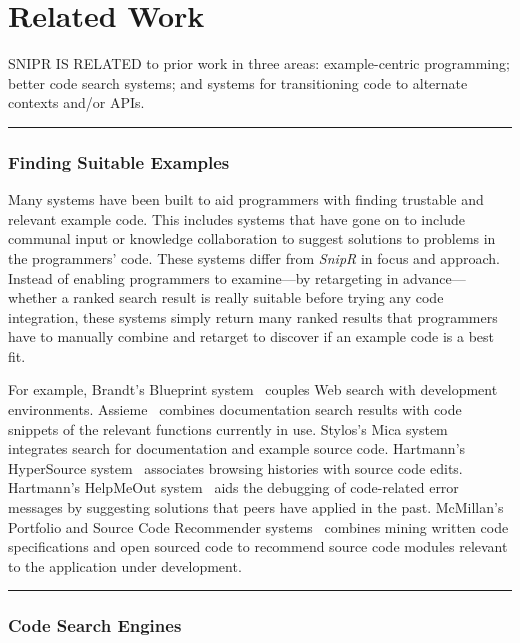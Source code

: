 \chapter{Related Work}{}
\label{sec:related}

\lettrine[lraise=0.1, nindent=0em, slope=-.5em]{S} {NIPR IS RELATED} to prior work in three areas: example-centric programming; better code search systems; and systems for transitioning code to alternate contexts and/or APIs.

\fancybreak{\pfbreakdisplay}

\subsection{Finding Suitable Examples}
\label{sec:codesearch}

Many systems have been built to aid programmers with finding trustable and relevant example code. This includes systems that have gone on to include communal input or knowledge collaboration to suggest solutions to problems in the programmers' code. These systems differ from \emph{SnipR} in focus and approach. Instead of enabling programmers to examine---by retargeting in advance---whether a ranked search result is really suitable before trying any code integration, these systems simply return many ranked results that programmers have to manually combine and retarget to discover if an example code is a best fit. 

For example, Brandt’s Blueprint system~\cite{Brandt:2010tp} couples Web search with development environments. Assieme~\cite{Hoffmann:2007wo} combines documentation search results with code snippets of the relevant functions currently in use. Stylos's Mica system~\cite{Stylos:2006gu} integrates search for documentation and example source code. Hartmann's HyperSource system~\cite{Hartmann:2011ii} associates browsing histories with source code edits. Hartmann's HelpMeOut system~\cite{Hartmann:2010hx} aids the debugging of code-related error messages by suggesting solutions that peers have applied in the past. McMillan's Portfolio and Source Code Recommender systems~\cite{McMillan:2011wq, McMillan:2012dj} combines mining written code specifications and open sourced code to recommend source code modules relevant to the application under development.

\fancybreak{\pfbreakdisplay}

\subsection{Code Search Engines}
\label{sec:searchengines}
